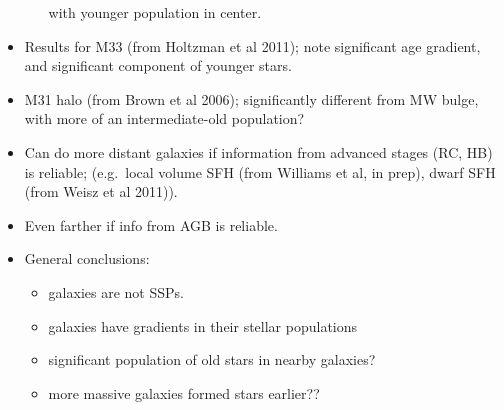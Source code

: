 \documentclass{article}
\begin{document}
\begin{itemize}
\begin{itemize}
                      with younger population in center.
              \end{itemize}
          \item Results for M33 (from Holtzman et al 2011); note significant age
              gradient, and significant component of younger stars.
          \item M31 halo (from Brown et al 2006); significantly different from
              MW bulge, with more of an intermediate-old population?
          \item Can do more distant galaxies if information from advanced stages
              (RC, HB) is reliable; (e.g.\ local volume SFH (from Williams et al,
              in prep), dwarf SFH (from Weisz et al 2011)).
          \item Even farther if info from AGB is reliable.
          \item General conclusions:
              \begin{itemize}
                  \item galaxies are not SSPs.
                  \item galaxies have gradients in their stellar populations
                  \item significant population of old stars in nearby galaxies?
                  \item more massive galaxies formed stars earlier??
              \end{itemize}
      \end{itemize}
\end{document}
